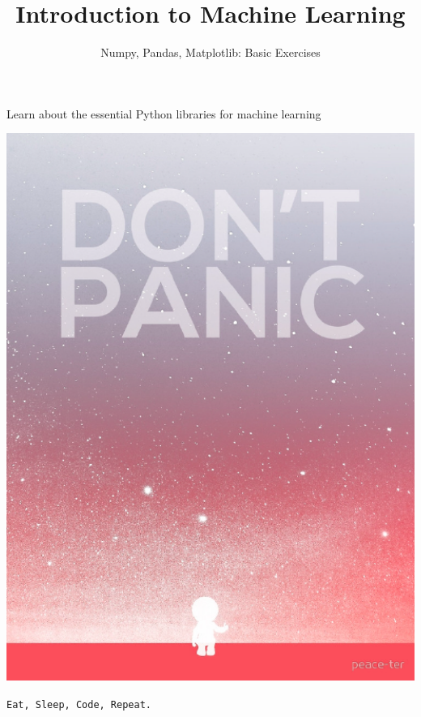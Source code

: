 \documentclass{42-en}
\begin{document}
\title{Introduction to Machine Learning}
\subtitle{Numpy, Pandas, Matplotlib: Basic Exercises}


\summary 
{
Learn about the essential Python libraries for machine learning
}

\maketitle

\tableofcontents


\newpage

\bigskip

\centerline{\includegraphics[width=150mm]{images/dontpanic.png}}

\centerline{\texttt{Eat, Sleep, Code, Repeat.}}
\end{document}
